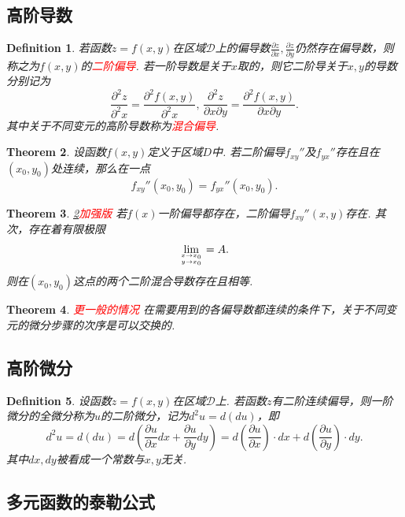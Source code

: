\documentclass{article}
\newtheorem{theorem}{Theorem}[section]
\newtheorem{definition}[theorem]{Definition}
\newcommand{\redt}[1]{\textcolor{red}{#1}}
\begin{document}
\subsection{高阶导数}

\begin{definition}
\rm 若函数$z=f(x,y)$在区域$\mathcal{D}$上的偏导数$\frac{\partial z}{\partial x},\frac{\partial z}{\partial y}$仍然存在偏导数，则称之为$f(x,y)$的\redt{二阶偏导}. 若一阶导数是关于$x$取的，则它二阶导关于$x,y$的导数分别记为
$$
\frac{\partial^2z}{\partial^2 x} = \frac{\partial^2 f(x,y)}{\partial^2 x},\, \frac{\partial^2z}{\partial x \partial y} = \frac{\partial^2 f(x,y)}{\partial x \partial y}.  
$$
其中关于不同变元的高阶导数称为\redt{混合偏导}.
\end{definition}

\begin{theorem}\label{mixed-derivatives: exchange-order}
\rm 设函数$f(x,y)$定义于区域$D$中. 若二阶偏导$f_{xy}''$及$f_{yx}''$存在且在$(x_0,y_0)$处连续，那么在一点
$$
f_{xy}''(x_0,y_0) = f_{yx}''(x_0,y_0).
$$
\end{theorem}

\begin{theorem}
\rm \redt{\ref{mixed-derivatives: exchange-order}加强版} 若$f(x)$一阶偏导都存在，二阶偏导$f_{xy}''(x,y)$存在. 其次，存在着有限极限
$$
\lim\limits_{x \rightarrow x_0 \atop y \rightarrow x_0} = A.
$$
则在$(x_0,y_0)$这点的两个二阶混合导数存在且相等.
\end{theorem}

\begin{theorem}
\rm \redt{更一般的情况} 在需要用到的各偏导数都连续的条件下，关于不同变元的微分步骤的次序是可以交换的. 
\end{theorem}


\subsection{高阶微分}

\begin{definition}
\rm 设函数$z=f(x,y)$在区域$\mathcal{D}$上. 若函数$z$有二阶连续偏导，则一阶微分的全微分称为$u$的二阶微分，记为$d^2 u = d(du)$，即
$$
d^2 u = d(du) = d(\frac{\partial u}{\partial x}dx + \frac{\partial u}{\partial y}dy) = d\left(\frac{\partial u}{\partial x}\right)\cdot dx + d\left(\frac{\partial u}{\partial y}\right)\cdot dy.
$$
其中$dx,dy$被看成一个常数与$x,y$无关. 
\end{definition}

\subsection{多元函数的泰勒公式}
\end{document}
